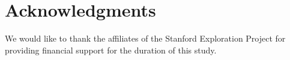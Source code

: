 \section{Acknowledgments}
\vspace*{-0.2cm}
We would like to thank the affiliates of the Stanford Exploration Project for providing financial support for the duration of this study.